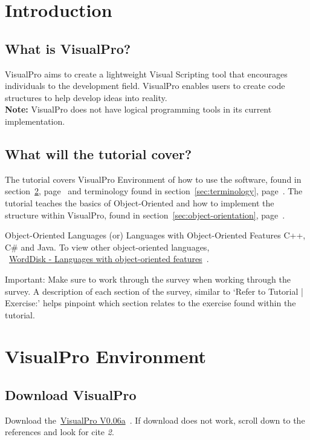 \documentclass[10pt]{article}
\begin{document}
\newpage
\section{Introduction}
    \subsection{What is VisualPro?}
        VisualPro aims to create a lightweight Visual Scripting tool that encourages individuals to the development field. VisualPro enables users to create code structures to help develop ideas into reality. \\\textbf{Note:} VisualPro does not have logical programming tools in its current implementation.

    \subsection{What will the tutorial cover?}
        The tutorial covers VisualPro Environment of how to use the software, found in section~\ref{sec:vp-env}, page~\pageref{sec:vp-env} and terminology found in section~\ref{sec:terminology}, page~\pageref{sec:terminology}.
        The tutorial teaches the basics of Object-Oriented and how to implement the structure within VisualPro, found in section~\ref{sec:object-orientation}, page~\pageref{sec:object-orientation}.
        
        \begin{example}{Object-Oriented Languages (or) Languages with Object-Oriented Features}
            C++, C\# and Java. To view other object-oriented languages,\\~\href{https://worddisk.com/wiki/List_of_object-oriented_programming_languages/}{WordDisk - Languages with object-oriented features}~\cite{word_disk_list_2018}.
        \end{example}

    \begin{tip}{Important:}
        Make sure to work through the survey when working through the survey. A description of each section of the survey, similar to `Refer to Tutorial | Exercise:' helps pinpoint which section relates to the exercise found within the tutorial.
    \end{tip}

\section{VisualPro Environment}
\label{sec:vp-env}
    \subsection{Download VisualPro}
        Download the~\href{https://github.com/ShinkuKira21/VisualPro-FinalProject/releases/tag/VP-V0.06A}{VisualPro V0.06a}~\cite{patch_visualpro_2022}. If download does not work, scroll down to the references and look for cite \textit{2}.
\end{document}
